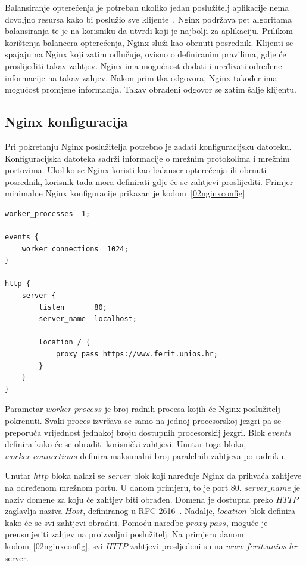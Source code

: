 Balansiranje opterećenja je potreban ukoliko jedan poslužitelj aplikacije nema dovoljno resursa kako
bi poslužio sve klijente~\citep{soni2016load}. Nginx podržava pet algoritama balansiranja te je na
korisniku da utvrdi koji je najbolji za aplikaciju. Prilikom korištenja balancera opterećenja, Nginx
služi kao obrnuti posrednik. Klijenti se spajaju na Nginx koji zatim odlučuje, ovisno o definiranim
pravilima, gdje će proslijediti takav zahtjev. Nginx ima mogućnost dodati i uređivati određene
informacije na takav zahjev. Nakon primitka odgovora, Nginx također ima mogućost promjene
informacija. Takav obrađeni odgovor se zatim šalje klijentu.

\subsection{Nginx konfiguracija}
Pri pokretanju Nginx poslužitelja potrebno je zadati konfiguracijsku datoteku. Konfiguracijska
datoteka sadrži informacije o mrežnim protokolima i mrežnim portovima. Ukoliko se Nginx koristi kao
balanser opterećenja ili obrnuti posrednik, korisnik tada mora definirati gdje će se zahtjevi
proslijediti. Primjer minimalne Nginx konfiguracije prikazan je kodom~\ref{02nginxconfig}

\begin{lstlisting}[float=h]
worker_processes  1;

events {
    worker_connections  1024;
}

http {
    server {
        listen       80;
        server_name  localhost;

        location / {
            proxy_pass https://www.ferit.unios.hr;
        }
    }
}
\end{lstlisting}

Parametar $worker\_process$ je broj radnih procesa kojih će Nginx poslužitelj pokrenuti. Svaki
proces izvršava se samo na jednoj procesorskoj jezgri pa se preporuča vrijednost jednakoj broju
dostupnih procesorskij jezgri. Blok $events$ definira kako će se obraditi korisnički zahtjevi.
Unutar toga bloka, $worker\_connections$ definira maksimalni broj paralelnih zahtjeva po radniku.

Unutar $http$ bloka nalazi se $server$ blok koji naređuje Nginx da prihvaća zahtjeve na određenom
mrežnom portu. U danom primjeru, to je port 80. $server\_name$ je naziv domene za koju će zahtjev
biti obrađen. Domena je dostupna preko $HTTP$ zaglavlja naziva $Host$, definiranog u RFC
2616~\citep{fielding1999hypertext}. Nadalje, $location$ blok definira kako će se svi zahtjevi
obraditi. Pomoću naredbe $proxy\_pass$, moguće je preusmjeriti zahjev na proizvoljni poslužitelj. Na
primjeru danom kodom~\ref{02nginxconfig}, svi $HTTP$ zahtjevi prosljeđeni su na $www.ferit.unios.hr$
server.

